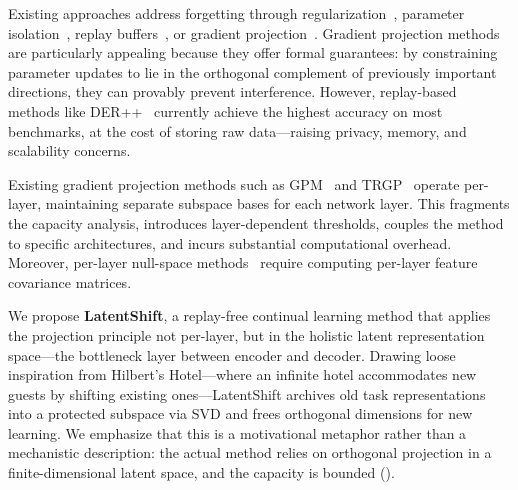 \documentclass{article}
\begin{document}
Existing approaches address forgetting through regularization~\citep{kirkpatrick2017overcoming,zenke2017continual},
parameter isolation~\citep{mallya2018packnet,serra2018overcoming}, replay
buffers~\citep{chaudhry2019tiny,buzzega2020dark}, or gradient
projection~\citep{saha2021gradient,farajtabar2020orthogonal}. Gradient
projection methods are particularly appealing because they offer formal
guarantees: by constraining parameter updates to lie in the orthogonal
complement of previously important directions, they can provably prevent
interference. However, replay-based methods like DER++~\citep{buzzega2020dark}
currently achieve the highest accuracy on most benchmarks, at the cost of
storing raw data---raising privacy, memory, and scalability concerns.

Existing gradient projection methods such as GPM~\citep{saha2021gradient}
and TRGP~\citep{lin2022trgp} operate per-layer, maintaining separate subspace
bases for each network layer. This fragments the capacity analysis, introduces
layer-dependent thresholds, couples the method to specific architectures, and
incurs substantial computational overhead. Moreover, per-layer null-space
methods~\citep{wang2021training,kong2022balancing} require computing
per-layer feature covariance matrices.

We propose \textbf{LatentShift}, a replay-free continual learning method that
applies the projection principle not per-layer, but in the holistic latent
representation space---the bottleneck layer between encoder and decoder.
Drawing loose inspiration from Hilbert's Hotel---where an infinite hotel
accommodates new guests by shifting existing ones---LatentShift archives
old task representations into a protected subspace via SVD and frees
orthogonal dimensions for new learning. We emphasize that this is a
motivational metaphor rather than a mechanistic description: the actual
method relies on orthogonal projection in a finite-dimensional latent space,
and the capacity is bounded ().
\end{document}
